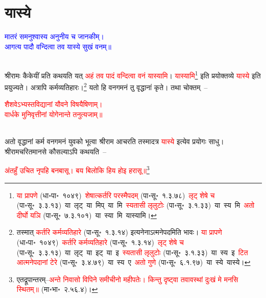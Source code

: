 \section[यास्ये]{यास्ये}
\label{sec:yasye}
\centering\textcolor{blue}{मातरं समनुश्वास्य अनुनीय च जानकीम्।\nopagebreak\\
आगत्य पादौ वन्दित्वा तव यास्ये सुखं वनम्॥}\nopagebreak\\
\\
\fontsize{14}{21}\selectfont\begin{sloppypar}\justifying\noindent\hspace{10mm} श्रीरामः कैकेयीं प्रति कथयति यत् \textcolor{red}{अहं तव पादं वन्दित्वा वनं यास्यामि}। \textcolor{red}{यास्यामि}\footnote{\textcolor{red}{या प्रापणे} (धा॰पा॰~१०४९)~\arrow \textcolor{red}{शेषात्कर्तरि परस्मैपदम्} (पा॰सू॰~१.३.७८)~\arrow \textcolor{red}{लृट् शेषे च} (पा॰सू॰~३.३.१३)~\arrow या~लृट्~\arrow या~मिप्~\arrow या~मि~\arrow \textcolor{red}{स्यतासी लृलुटोः} (पा॰सू॰~३.१.३३)~\arrow या~स्य~मि~\arrow \textcolor{red}{अतो दीर्घो यञि} (पा॰सू॰~७.३.१०१)~\arrow या~स्या~मि~\arrow यास्यामि।} इति प्रयोक्तव्ये \textcolor{red}{यास्ये} इति प्रयुज्यते। अत्रापि कर्म\-व्यतिहारः।\footnote{तस्मात् \textcolor{red}{कर्तरि कर्मव्यतिहारे} (पा॰सू॰~१.३.१४) इत्यनेनाऽत्मनेपदमिति भावः। \textcolor{red}{या प्रापणे} (धा॰पा॰~१०४९)~\arrow \textcolor{red}{कर्तरि कर्मव्यतिहारे} (पा॰सू॰~१.३.१४)~\arrow \textcolor{red}{लृट् शेषे च} (पा॰सू॰~३.३.१३)~\arrow या~लृट्~\arrow या~इट्~\arrow या~इ~\arrow \textcolor{red}{स्यतासी लृलुटोः} (पा॰सू॰~३.१.३३)~\arrow या~स्य~इ~\arrow \textcolor{red}{टित आत्मनेपदानां टेरे} (पा॰सू॰~३.४.७९)~\arrow या~स्य~ए~\arrow \textcolor{red}{अतो गुणे} (पा॰सू॰~६.१.९७)~\arrow या~स्ये~\arrow यास्ये।} यतो हि वन\-गमनं तु वृद्धानां कृते। तथा चोक्तम्~–\end{sloppypar}
\centering\textcolor{red}{शैशवेऽभ्यस्तविद्यानां यौवने विषयैषिणाम्।\nopagebreak\\
वार्धके मुनिवृत्तीनां योगेनान्ते तनुत्यजाम्॥}\nopagebreak\\
\\
\fontsize{14}{21}\selectfont\begin{sloppypar}\justifying\noindent
 अतो वृद्धानां कर्म वन\-गमनं युवको भूत्वा श्रीराम आचरति तस्मादत्र \textcolor{red}{यास्ये} इत्येव प्रयोगः साधु। श्रीरामचरितमानसे कौसल्याऽपि कथयति~–\end{sloppypar}
\centering\textcolor{red}{अंतहुँ उचित नृपहि बनबासू। बय बिलोकि हिय होइ हरासू॥}\footnote{एतद्रूपान्तरम्–\textcolor{red}{अन्ते निवासो विपिने समीचीनो महीपतेः। किन्तु दृष्ट्वा तवावस्थां दुःखं मे मनसि स्थितम्॥} (मा॰भा॰~२.५६.४)।}\nopagebreak\\
